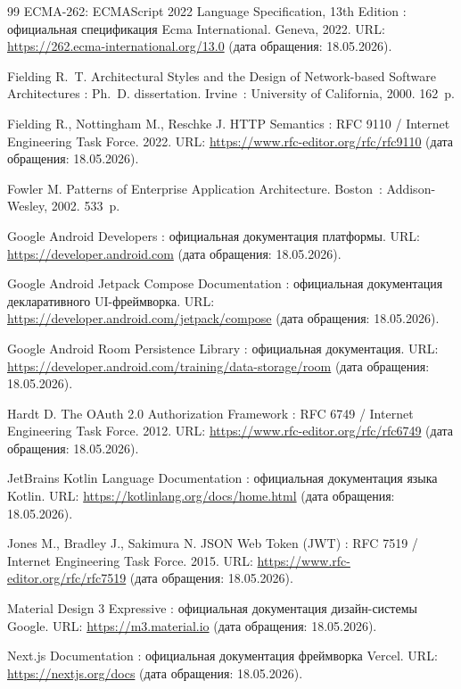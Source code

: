\begin{thebibliography}{99}
   ECMA-262: ECMAScript 2022 Language Specification, 13th Edition : официальная спецификация Ecma International. Geneva, 2022. URL: \url{https://262.ecma-international.org/13.0} (дата обращения: 18.05.2026).

   Fielding R.~T. Architectural Styles and the Design of Network-based Software Architectures : Ph.~D. dissertation. Irvine~: University of California, 2000. 162~p.

   Fielding R., Nottingham M., Reschke J. HTTP Semantics : RFC 9110 / Internet Engineering Task Force. 2022. URL: \url{https://www.rfc-editor.org/rfc/rfc9110} (дата обращения: 18.05.2026).

   Fowler M. Patterns of Enterprise Application Architecture. Boston~: Addison-Wesley, 2002. 533~p.

   Google Android Developers : официальная документация платформы. URL: \url{https://developer.android.com} (дата обращения: 18.05.2026).

   Google Android Jetpack Compose Documentation : официальная документация декларативного UI-фреймворка. URL: \url{https://developer.android.com/jetpack/compose} (дата обращения: 18.05.2026).

   Google Android Room Persistence Library : официальная документация. URL: \url{https://developer.android.com/training/data-storage/room} (дата обращения: 18.05.2026).

   Hardt D. The OAuth 2.0 Authorization Framework : RFC 6749 / Internet Engineering Task Force. 2012. URL: \url{https://www.rfc-editor.org/rfc/rfc6749} (дата обращения: 18.05.2026).

   JetBrains Kotlin Language Documentation : официальная документация языка Kotlin. URL: \url{https://kotlinlang.org/docs/home.html} (дата обращения: 18.05.2026).

   Jones M., Bradley J., Sakimura N. JSON Web Token (JWT) : RFC 7519 / Internet Engineering Task Force. 2015. URL: \url{https://www.rfc-editor.org/rfc/rfc7519} (дата обращения: 18.05.2026).

   Material Design 3 Expressive : официальная документация дизайн-системы Google. URL: \url{https://m3.material.io} (дата обращения: 18.05.2026).

   Next.js Documentation : официальная документация фреймворка Vercel. URL: \url{https://nextjs.org/docs} (дата обращения: 18.05.2026).


\end{thebibliography}
